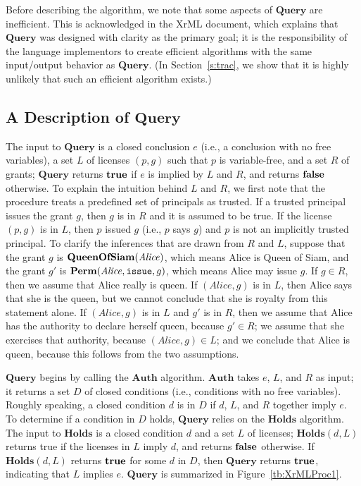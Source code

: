 \documentclass{acmtrans2m}
\newcommand{\<}{
}
\renewcommand{\>}{\rangle}
\newcommand{\true}{\mathit{\bf{true}}}
\newcommand{\false}{\mathit{\bf{false}}}
\newcommand{\Permitted}{\mathit{\bf Perm}}
\newcommand{\cd}{d}
\newcommand{\cc}{e}
\newcommand{\issue}{\mathtt{issue}}
\newcommand{\XA}{\textbf{Auth}}
\newcommand{\CMet}{\textbf{Holds}}
\newcommand{\XProc}{\textbf{Query}}
\begin{document}
Before describing the algorithm, we note that some aspects of $\XProc$ are inefficient.  This is
acknowledged in the XrML document, which explains that $\XProc$ was designed with clarity as the primary
goal; it is the responsibility of the language implementors to create efficient algorithms with the same input/output behavior as $\XProc$.  (In Section~\ref{s:trac}, we show that it is highly unlikely that
such an efficient algorithm exists.)

\subsection{A Description of $\XProc$}\label{sec:XProcdesc}
The input to $\XProc$ is a closed conclusion $\cc$ (i.e., a conclusion with no free variables), a set
$L$ of licenses $(p,g)$ such that $p$ is variable-free, and a set $R$ of grants; $\XProc$ returns
$\true$ if $\cc$ is implied by $L$ and $R$, and returns $\false$ otherwise.  To explain the intuition
behind $L$ and $R$, we first note that the procedure treats a predefined set of principals as trusted.
If a trusted principal issues the grant $g$, then $g$ is in $R$ and it is assumed to be true.  If the
license $(p, g)$ is in $L$, then $p$ issued $g$ (i.e., $p$ says $g$) and $p$ is not an implicitly
trusted principal.  To clarify the inferences that are drawn from $R$ and $L$, suppose that the grant
$g$ is $\mathit{\bf QueenOfSiam}(\mathit{Alice})$, which means Alice is Queen of Siam, and the grant
$g'$ is $\Permitted(\mathit{Alice}, \issue, g)$, which means Alice may issue $g$.  If $g\in R$, then
we assume that Alice really is queen.  If $(\mathit{Alice}, g)$ is in $L$, then Alice says that she
is the queen, but we cannot conclude that she is royalty from this statement alone.  If
$(\mathit{Alice}, g)$ is in $L$ and $g'$ is in $R$, then we assume that Alice has the authority to
declare herself queen, because $g'\in R$; we assume that she exercises that authority, because
$(\mathit{Alice}, g)\in L$; and we conclude that Alice is queen, because this follows from the two
assumptions.

$\XProc$ begins by calling the $\XA$ algorithm.  $\XA$ takes $\cc$, $L$, and $R$ as input; it returns
a set $D$ of closed conditions (i.e., conditions with no free variables).  Roughly speaking, a closed
condition $\cd$ is in $D$ if $\cd$, $L$, and $R$ together imply $\cc$.  To determine if a condition
in $D$ holds, $\XProc$ relies on the $\CMet$ algorithm.  The input to $\CMet$ is a closed condition
$\cd$ and a set $L$ of licenses; $\CMet(d, L)$ returns true if the licenses in $L$ imply $\cd$, and
returns $\false$ otherwise.  If $\CMet(\cd, L)$ returns $\true$ for some $\cd$ in $D$, then $\XProc$
returns $\true$, indicating that $L$ implies $\cc$.  $\XProc$ is summarized in
Figure~\ref{tb:XrMLProc1}.
\end{document}
